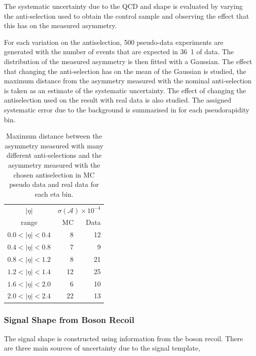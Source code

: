 The systematic uncertainty due to the \ac{QCD} and \gjet \ETm shape is evaluated by
varying the anti-selection used to obtain the control sample and observing the
effect that this has on the measured asymmetry.

For each variation on the antiselection, 500 pseudo-data experiments are
generated with the number of events that are expected in \unit{36.1}{\invpb} of
data. The distribution of the measured asymmetry is then fitted with a
Gaussian.
The effect that changing the anti-selection has on the mean of the Gaussian is
studied, the maximum distance from the asymmetry measured with the nominal
anti-selection is taken as an estimate of the systematic uncertainty.
The effect of changing the antiselection used on the result with real data is
also studied.
The assigned systematic error due to the background is summarised in
 for each pseudorapidity bin.

\begin{table}[htbp]
\begin{center}
\begin{tabular}{crr}
    \toprule
$|\eta|$  &\multicolumn{2}{c}{ $\sigma(\mathcal{A}) \times 10^{-4}$}\\
   range      & MC & Data\\
\midrule
$0.0<|\eta|<0.4$ & 8 & 12\\
$0.4<|\eta|<0.8$ & 7 & 9\\
$0.8<|\eta|<1.2$ & 8 & 21\\
$1.2<|\eta|<1.4$ & 12& 25\\
$1.6<|\eta|<2.0$ & 6 & 10\\
$2.0<|\eta|<2.4$ & 22& 13\\
    \bottomrule
\end{tabular}
\caption{Maximum distance between the asymmetry measured with many different anti-selections
and the asymmetry measured with the chosen antiselection in MC pseudo data and real data for each eta bin.}
\label{tab:systQCD}
\end{center}
\end{table}

\subsubsection{Signal \ETm Shape from Boson Recoil}

The signal \ETm shape is constructed using information from the boson recoil.
There are three main sources of uncertainty due to the signal template,

